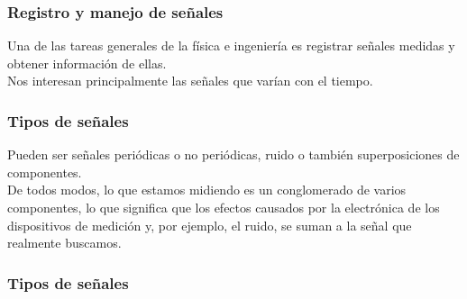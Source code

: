 \documentclass[12pt]{beamer}
\begin{document}
\begin{frame}
\frametitle{Registro y manejo de señales}
Una de las tareas generales de la física e ingeniería es registrar señales medidas y obtener información de ellas.
\\
\bigskip
\pause
Nos interesan principalmente las señales que varían con el tiempo.
\end{frame}
\begin{frame}
\frametitle{Tipos de señales}
Pueden ser señales periódicas o no periódicas, ruido o también superposiciones de componentes.
\\
\bigskip
\pause
De todos modos, lo que estamos midiendo es un conglomerado de varios componentes, lo que significa que los efectos causados por la electrónica de los dispositivos de medición y, por ejemplo, el ruido, se suman a la señal que realmente buscamos.
\end{frame}
\begin{frame}
\frametitle{Tipos de señales}
\begin{figure}
    \centering
\end{figure}
\end{frame}
\end{document}
